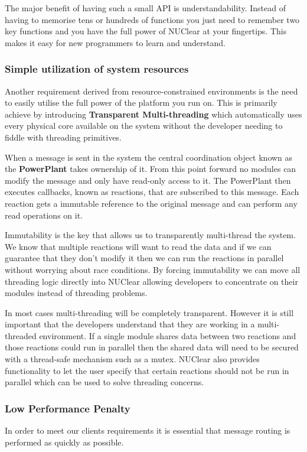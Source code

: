 \documentclass[english,12pt]{scrartcl}
\begin{document}
				The major benefit of having such a small API is understandability. 
				Instead of having to memorise tens or hundreds of functions you just need to remember two key functions and you have the full power of NUClear at your fingertips.
				This makes it easy for new programmers to learn and understand.
			
			\subsubsection{Simple utilization of system resources}
				Another requirement derived from resource-constrained environments is the need to easily utilise the full power of the platform you run on.
				This is primarily achieve by introducing \textbf{Transparent Multi-threading} which automatically uses every physical core available on the system without the developer needing to fiddle with threading primitives.
				
				When a message is sent in the system the central coordination object known as the \textbf{PowerPlant} takes ownership of it. 
				From this point forward no modules can modify the message and only have read-only access to it.
				The PowerPlant then executes callbacks, known as reactions, that are subscribed to this message.
				Each reaction gets a immutable reference to the original message and can perform any read operations on it.
				
				Immutability is the key that allows us to transparently multi-thread the system.
				We know that multiple reactions will want to read the data and if we can guarantee that they don't modify it then we can
				run the reactions in parallel without worrying about race conditions.
				By forcing immutability we can move all threading logic directly into NUClear allowing developers to concentrate on their modules instead of threading problems.
				
				In most cases multi-threading will be completely transparent. 
				However it is still important that the developers understand that they are working in a multi-threaded environment.
				If a single module shares data between two reactions and those reactions could run in parallel then the shared data will
				need to be secured with a thread-safe mechanism such as a mutex.
				NUClear also provides functionality to let the user specify that certain reactions should not be run in parallel which can be used to solve threading concerns.
			
			\subsubsection{Low Performance Penalty}
				In order to meet our clients requirements it is essential that message routing is performed as quickly as possible. 
			
\end{document}
